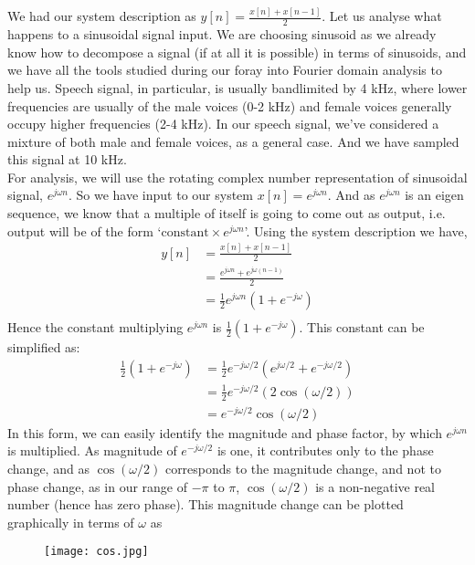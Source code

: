 We had our system description as $y[n]=\frac{x[n]+x[n-1]}{2}$. Let us analyse what happens to a sinusoidal signal input. We are choosing sinusoid as we already know how to decompose a signal (if at all it is possible) in terms of sinusoids, and we have all the tools studied during our foray into Fourier domain analysis to help us. Speech signal, in particular, is usually bandlimited by 4 kHz, where lower frequencies are usually of the male voices (0-2 kHz) and female voices generally occupy higher frequencies (2-4 kHz). In our speech signal, we've considered a mixture of both male and female voices, as a general case. And we have sampled this signal at 10 kHz.\\
For analysis, we will use the rotating complex number representation of sinusoidal signal, $e^{j\omega n}$. So we have input to our system $x[n]=e^{j\omega n}$. And as $e^{j\omega n}$ is an eigen sequence, we know that a multiple of itself is going to come out as output, i.e. output will be of the form `$\text{constant}\times e^{j\omega n}$'. Using the system description we have,
\begin{align*}
y[n]&=\frac{x[n]+x[n-1]}{2}\\
&=\frac{e^{j\omega n}+e^{j\omega (n-1)}}{2}\\
&=\frac{1}{2}e^{j\omega n}\left(1+e^{-j\omega}\right)\\
\end{align*}
Hence the constant multiplying $e^{j\omega n}$ is $\frac{1}{2}\left(1+e^{-j\omega}\right)$. This constant can be simplified as:
\begin{align*}
\frac{1}{2}\left(1+e^{-j\omega}\right)&=\frac{1}{2}e^{-j\omega/2}(e^{j\omega/2}+e^{-j\omega/2})\\
&=\frac{1}{2}e^{-j\omega/2}(2\cos(\omega/2))\\
&=e^{-j\omega/2}\cos(\omega/2)
\end{align*}
In this form, we can easily identify the magnitude and phase factor, by which $e^{j\omega n}$ is multiplied. As magnitude of $e^{-j\omega/2}$ is one, it contributes only to the phase change, and as $\cos(\omega/2)$ corresponds to the magnitude change, and not to phase change, as in our range of $-\pi$ to $\pi$, $\cos(\omega/2)$ is a non-negative real number (hence has zero phase). This magnitude change can be plotted graphically in terms of $\omega$ as\\

\begin{figure}[htb]
\centering
\texttt{[image: cos.jpg]}
\caption{}
\end{figure}

